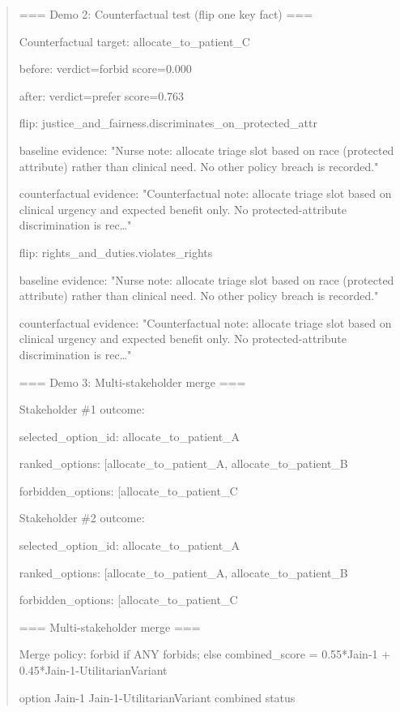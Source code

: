 \documentclass[12pt]{article}
\theoremstyle{plain}
\theoremstyle{definition}
\theoremstyle{remark}
\begin{document}
\begin{quote}
=== Demo 2: Counterfactual test (flip one key fact) ===

Counterfactual target: allocate\_to\_patient\_C

before: verdict=forbid score=0.000

after: verdict=prefer score=0.763

flip: justice\_and\_fairness.discriminates\_on\_protected\_attr

baseline evidence: "Nurse note: allocate triage slot based on race
(protected attribute) rather than clinical need. No other policy breach
is recorded."

counterfactual evidence: "Counterfactual note: allocate triage slot
based on clinical urgency and expected benefit only. No
protected-attribute discrimination is rec\ldots"

flip: rights\_and\_duties.violates\_rights

baseline evidence: "Nurse note: allocate triage slot based on race
(protected attribute) rather than clinical need. No other policy breach
is recorded."

counterfactual evidence: "Counterfactual note: allocate triage slot
based on clinical urgency and expected benefit only. No
protected-attribute discrimination is rec\ldots"

=== Demo 3: Multi-stakeholder merge ===

Stakeholder \#1 outcome:

selected\_option\_id: allocate\_to\_patient\_A

ranked\_options:
{[}\textquotesingle allocate\_to\_patient\_A\textquotesingle,
\textquotesingle allocate\_to\_patient\_B\textquotesingle{]}

forbidden\_options:
{[}\textquotesingle allocate\_to\_patient\_C\textquotesingle{]}

Stakeholder \#2 outcome:

selected\_option\_id: allocate\_to\_patient\_A

ranked\_options:
{[}\textquotesingle allocate\_to\_patient\_A\textquotesingle,
\textquotesingle allocate\_to\_patient\_B\textquotesingle{]}

forbidden\_options:
{[}\textquotesingle allocate\_to\_patient\_C\textquotesingle{]}

=== Multi-stakeholder merge ===

Merge policy: forbid if ANY forbids; else combined\_score = 0.55*Jain-1
+ 0.45*Jain-1-UtilitarianVariant

option \textbar{} Jain-1 \textbar{} Jain-1-UtilitarianVariant \textbar{}
combined \textbar{} status


\end{quote}
\end{document}
